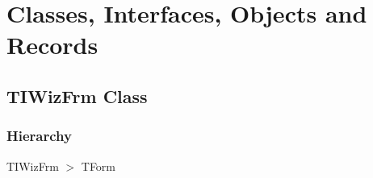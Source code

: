 \documentclass{report}
\newif\ifpdf
\begin{document}
\section{Classes, Interfaces, Objects and Records}
\ifpdf
\subsection*{\large{\textbf{TIWizFrm Class}}\normalsize\hspace{1ex}\hrulefill}
\else
\subsection*{TIWizFrm Class}
\fi
\label{igobase.TIWizFrm}
\subsubsection*{\large{\textbf{Hierarchy}}\normalsize\hspace{1ex}\hfill}
TIWizFrm {$>$} TForm
\end{document}
